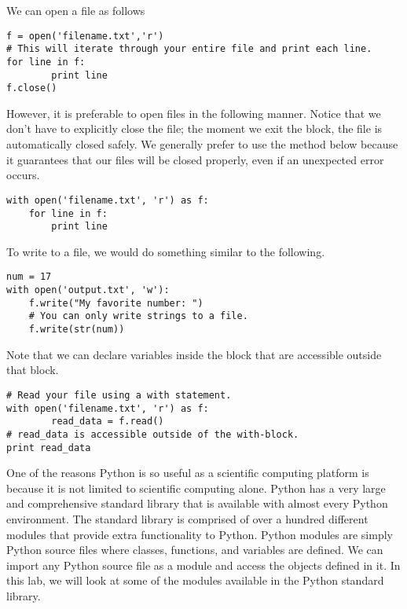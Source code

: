 We can open a file as follows
\begin{lstlisting}
f = open('filename.txt','r')
# This will iterate through your entire file and print each line.
for line in f:
        print line
f.close()
\end{lstlisting}
However, it is preferable to open files in the following manner.
Notice that we don't have to explicitly close the file;
the moment we exit the  block, the file is automatically closed safely.
We generally prefer to use the method below because it guarantees that our files will be closed properly, even if an unexpected error occurs.
\begin{lstlisting}
with open('filename.txt', 'r') as f:
    for line in f:
        print line
\end{lstlisting}

To write to a file, we would do something similar to the following.
\begin{lstlisting}
num = 17
with open('output.txt', 'w'):
    f.write("My favorite number: ")
    # You can only write strings to a file.
    f.write(str(num))
\end{lstlisting}

Note that we can declare variables inside the  block that are accessible outside that block.
\begin{lstlisting}
# Read your file using a with statement.
with open('filename.txt', 'r') as f:
        read_data = f.read()
# read_data is accessible outside of the with-block.
print read_data
\end{lstlisting}

One of the reasons Python is so useful as a scientific computing platform is because it is not limited to scientific computing alone.
Python has a very large and comprehensive standard library that is available with almost every Python environment.
The standard library is comprised of over a hundred different modules that provide extra functionality to Python.
Python modules are simply Python source files where classes, functions, and variables are defined.
We can import any Python source file as a module and access the objects defined in it.
In this lab, we will look at some of the modules available in the Python standard library.

